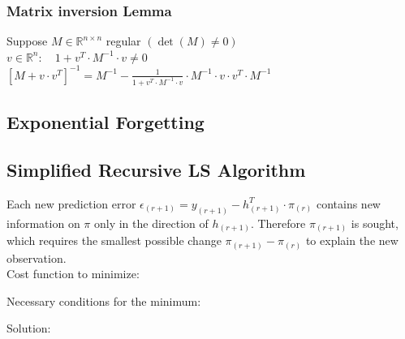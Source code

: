 \documentclass[10pt,a4paper]{scrartcl}
\begin{document}
\begin{multicols*}{3}
\subsubsection{Matrix inversion Lemma}

Suppose $M\in\mathbb{R}^{n\times n}$ regular $(\det(M)\neq 0)$ \\
$v\in\mathbb{R}^n:\quad 1+v^T\cdot M^{-1}\cdot v \neq 0$ \\
$[M+v\cdot v^T]^{-1}=M^{-1}-\frac{1}{1+v^T\cdot M^{-1}\cdot v}\cdot M^{-1}\cdot v\cdot v^T\cdot M^{-1}$

\subsection{Exponential Forgetting}


\small
{}\normalsize

\subsection{Simplified Recursive LS Algorithm}
Each new prediction error $\epsilon_{(r+1)} = y_{(r+1)} - h^T_{(r+1)} \cdot \pi_{(r)}$ contains new information on $\pi$ only in the direction of $h_{(r+1)}$. Therefore $\pi_{(r+1)}$ is sought, which requires the smallest possible change $\pi_{(r+1)}-\pi_{(r)}$ to explain the new observation.\\
Cost function to minimize:


Necessary conditions for the minimum:


Solution:



\end{multicols*}
\end{document}
